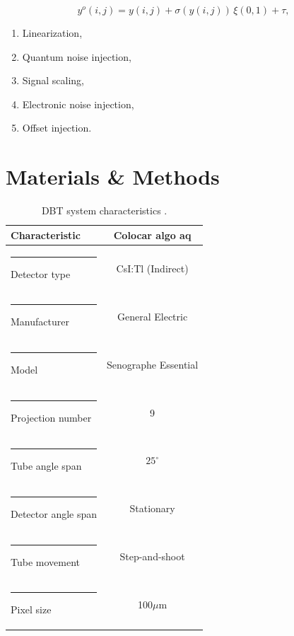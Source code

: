 \documentclass[10pt,twoside,twocolumn]{article}
\begin{document}
\begin{equation}
\label{eq.Eq1}
 y^{o}(i,j) = y(i,j) + \sigma(y(i,j)) \, \xi(0,1) + \tau,
\end{equation}


\begin{enumerate}
    \item Linearization,
    \item Quantum noise injection,
    \item Signal scaling,
    \item Electronic noise injection,
    \item Offset injection.
\end{enumerate}



\section{Materials \& Methods}



\begin{table}[ht]
\caption{DBT system characteristics \cite{vedantham2015digital}.}
	\label{tab:tab1}
   	\centering
	\begin{tabular}{l|c}
		\textbf{Characteristic}                                       &        \textbf{Colocar algo aq}              \\
		[1pt]
		\hline
        \rule[-0.5ex]{-3pt}{1ex}
		Detector type                 &         CsI:Tl (Indirect)                               \\ \hline
       	\rule[-0.5ex]{-3pt}{1ex}
		Manufacturer &    General Electric    \\ \hline
		\rule[-0.5ex]{-3pt}{1ex}
		Model &    Senographe Essential    \\ \hline
		\rule[-0.5ex]{-3pt}{1ex}
		Projection number              &                9                                               \\ \hline
		\rule[-0.5ex]{-3pt}{1ex}
		Tube angle span                &           $25^{\circ}$          		                          \\ \hline
		\rule[-0.5ex]{-3pt}{1ex}
		Detector angle span           &          Stationary                                  \\ \hline
		\rule[-0.5ex]{-3pt}{1ex}
		Tube movement                &     Step-and-shoot                              \\ \hline
		\rule[-0.5ex]{-3pt}{1ex}
		Pixel size        &            100$\mu$m                                \\ \hline
	\end{tabular}
\end{table}
\end{document}
